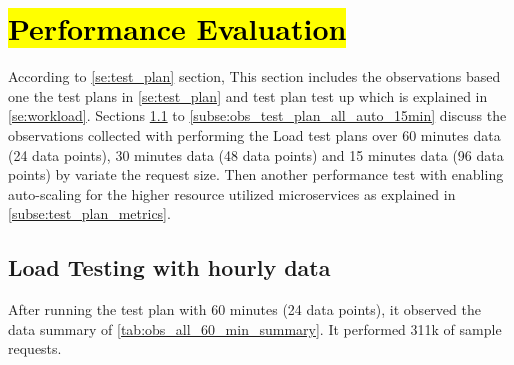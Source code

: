 \section{\hl{Performance Evaluation}}
\label{se:observations}

According to \cref{se:test_plan} section, This section includes the observations based one the test plans in \cref{se:test_plan} and test plan test up which is explained in \cref{se:workload}. Sections \ref{subse:obs_test_plan_all_60min} to \ref{subse:obs_test_plan_all_auto_15min} discuss the observations collected with performing the Load test plans over 60 minutes data (24 data points), 30 minutes data (48 data points) and 15 minutes data (96 data points) by variate the request size. Then another performance test with enabling auto-scaling for the higher resource utilized microservices as explained in \cref{subse:test_plan_metrics}.

\subsection{Load Testing with hourly data}
\label{subse:obs_test_plan_all_60min}

After running the test plan with 60 minutes (24 data points), it observed the data summary of \cref{tab:obs_all_60_min_summary}. It performed 311k of sample requests.

